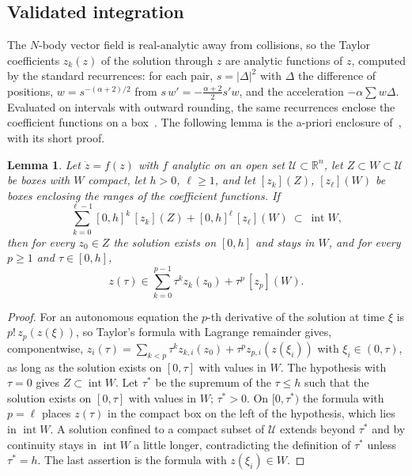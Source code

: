 \documentclass[11pt]{amsart}
\newtheorem{lemma}[theorem]{Lemma}
\theoremstyle{definition}
\newcommand{\R}{\mathbb{R}}
\newcommand{\intv}[1]{[#1]}
\DeclareMathOperator{\intr}{int}
\begin{document}
\subsection{Validated integration}
The $N$-body vector field is real-analytic away from collisions, so the Taylor coefficients $z_k(z)$ of the solution through $z$ are analytic functions of $z$, computed by the standard recurrences: for each pair, $s=|\Delta|^2$ with $\Delta$ the difference of positions, $w=s^{-(\alpha+2)/2}$ from $s\,w'=-\frac{\alpha+2}2s'w$, and the acceleration $-\alpha\sum w\Delta$. Evaluated on intervals with outward rounding, the same recurrences enclose the coefficient functions on a box~\cite{Moore1966,Lohner1987}. The following lemma is the a-priori enclosure of~\cite{NedialkovJacksonCorliss1999}, with its short proof.

\begin{lemma}\label{lem:enclosure}
Let $\dot z=f(z)$ with $f$ analytic on an open set $\mathcal U\subset\R^n$, let $Z\subset W\subset\mathcal U$ be boxes with $W$ compact, let $h>0$, $\ell\ge1$, and let $\intv{z_k}(Z)$, $\intv{z_\ell}(W)$ be boxes enclosing the ranges of the coefficient functions. If
\[
\sum_{k=0}^{\ell-1}[0,h]^k\,\intv{z_k}(Z)+[0,h]^\ell\,\intv{z_\ell}(W)\ \subset\ \intr W,
\]
then for every $z_0\in Z$ the solution exists on $[0,h]$ and stays in $W$, and for every $p\ge1$ and $\tau\in[0,h]$,
\[
z(\tau)\in\sum_{k=0}^{p-1}\tau^k z_k(z_0)+\tau^p\,\intv{z_p}(W).
\]
\end{lemma}

\begin{proof}
For an autonomous equation the $p$-th derivative of the solution at time $\xi$ is $p!\,z_p(z(\xi))$, so Taylor's formula with Lagrange remainder gives, componentwise, $z_i(\tau)=\sum_{k<p}\tau^kz_{k,i}(z_0)+\tau^pz_{p,i}(z(\xi_i))$ with $\xi_i\in(0,\tau)$, as long as the solution exists on $[0,\tau]$ with values in $W$. The hypothesis with $\tau=0$ gives $Z\subset\intr W$. Let $\tau^*$ be the supremum of the $\tau\le h$ such that the solution exists on $[0,\tau]$ with values in $W$; $\tau^*>0$. On $[0,\tau^*)$ the formula with $p=\ell$ places $z(\tau)$ in the compact box on the left of the hypothesis, which lies in $\intr W$. A solution confined to a compact subset of $\mathcal U$ extends beyond $\tau^*$ and by continuity stays in $\intr W$ a little longer, contradicting the definition of $\tau^*$ unless $\tau^*=h$. The last assertion is the formula with $z(\xi_i)\in W$.
\end{proof}
\end{document}

